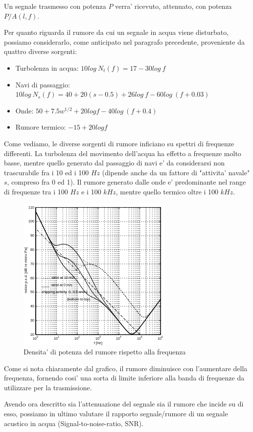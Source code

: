 Un segnale trasmesso con potenza $P$ verra' ricevuto, attenuato, con potenza $P/A(l, f)$.
\par
Per quanto riguarda il rumore da cui un segnale in acqua viene disturbato, possiamo considerarlo, come anticipato nel paragrafo precedente, proveniente da quattro diverse sorgenti:
\begin{itemize}
    \item Turbolenza in acqua: $10log\ N_t(f) = 17 - 30log\ f$
    \item Navi di passaggio: $10log\ N_s(f) = 40 + 20(s - 0.5) + 26log\ f - 60log\ (f+0.03)$
    \item Onde: $50 + 7.5w^{1/2}+ 20logf - 40log\ (f+0.4)$
    \item Rumore termico: $-15 + 20logf$
\end{itemize}
Come vediamo, le diverse sorgenti di rumore inficiano su spettri di frequenze differenti. La turbolenza del movimento dell'acqua ha effetto a frequenze molto basse, mentre quello generato dal passaggio di navi e' da considerarsi non trascurabile fra i 10 ed i 100 $Hz$ (dipende anche da un fattore di "attivita' navale" $s$, compreso fra 0 ed 1). Il rumore generato dalle onde e' predominante nel range di frequenze tra i 100 $Hz$ e i 100 $kHz$, mentre quello termico oltre i 100 $kHz$.
\begin{figure}[H]
    \centering
    \includegraphics[]{noise.png}
    \caption{Densita' di potenza del rumore rispetto alla frequenza}
\end{figure}
Come si nota chiaramente dal grafico, il rumore diminuisce con l'aumentare della frequenza, fornendo cosi' una sorta di limite inferiore alla banda di frequenze da utilizzare per la trasmissione.
\par
Avendo ora descritto sia l'attenuazione del segnale sia il rumore che incide su di esso, possiamo in ultimo valutare il rapporto segnale/rumore di un segnale acustico in acqua (Signal-to-noise-ratio, SNR).
